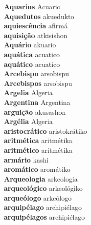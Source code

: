\textbf{ Aquarius  } Acuario \\
\textbf{ Aquedutos  } akuedukto \\
\textbf{ aquiescência  } afirmá \\
\textbf{ aquisição  } atkisishon \\
\textbf{ Aquário  } akuario \\
\textbf{ aquática  } acuatico \\
\textbf{ aquático  } acuatico \\
\textbf{ Arcebispo  } arsobispu \\
\textbf{ Arcebispos  } arsobispu \\
\textbf{ Argelia  } Algeria \\
\textbf{ Argentina  } Argentina \\
\textbf{ arguição  } akusashon \\
\textbf{ Argélia  } Algeria \\
\textbf{ aristocrático  } aristokrátiko \\
\textbf{ aritmética  } aritmétika \\
\textbf{ aritmético  } aritmétika \\
\textbf{ armário  } kashi \\
\textbf{ aromático  } aromátiko \\
\textbf{ Arqueologia  } arkeologia \\
\textbf{ arqueológico  } arkeológiko \\
\textbf{ arqueólogo  } arkeólogo \\
\textbf{ arquipélago  } archipiélago \\
\textbf{ arquipélagos  } archipiélago \\

